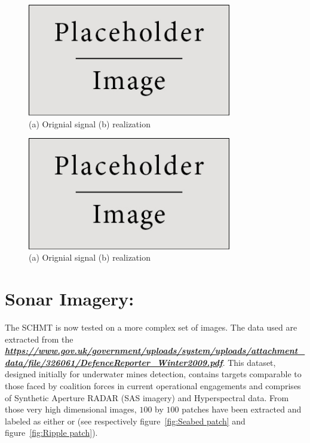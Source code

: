 \documentclass[a4paper,11pt]{report}
\begin{document}
		\begin{figure}
			\begin{center}
				\includegraphics[width=3.5in]{placeholder.jpg}
			  \caption[Shape classification: square]{(a) Orignial signal (b) realization}
			  \label{fig:Shape square}
			\end{center}
		\end{figure}
		
		\begin{figure}
			\begin{center}
				\includegraphics[width=3.5in]{placeholder.jpg}
			  \caption[Shape classification: triangle]{(a) Orignial signal (b) realization}
			  \label{fig:Shape triangle}
			\end{center}
		\end{figure}
		
  \section{Sonar Imagery:}
		\label{sec:Exp/Sonar:}
		The SCHMT is now tested on a more complex set of images. The data used are extracted from the  \textbf{\textit{\url{https://www.gov.uk/government/uploads/system/uploads/attachment_data/file/326061/DefenceReporter_Winter2009.pdf}}}. This dataset, designed initially for underwater mines detection, contains targets comparable to those faced by coalition forces in current operational engagements and comprises of Synthetic Aperture RADAR (SAS imagery) and Hyperspectral data. From those very high dimensional images, $100$ by $100$ patches have been extracted and labeled as either  or  (see respectively figure~\ref{fig:Seabed patch} and figure~\ref{fig:Ripple patch}).\\
\end{document}
